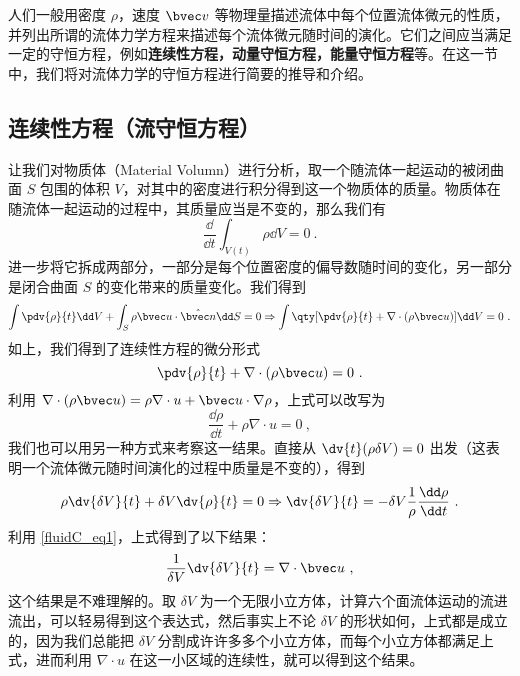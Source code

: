

人们一般用密度 $\rho$，速度 $\bvec v$ 等物理量描述流体中每个位置流体微元的性质，并列出所谓的流体力学方程来描述每个流体微元随时间的演化。它们之间应当满足一定的守恒方程，例如\textbf{连续性方程，动量守恒方程，能量守恒方程}等。在这一节中，我们将对流体力学的守恒方程进行简要的推导和介绍。
\subsection{连续性方程（流守恒方程）}
让我们对物质体（Material Volumn）进行分析，取一个随流体一起运动的被闭曲面 $S$ 包围的体积 $V$，对其中的密度进行积分得到这一个物质体的质量。物质体在随流体一起运动的过程中，其质量应当是不变的，那么我们有
\begin{equation}
\frac{\dd}{\dd t}\int_{V(t)} \rho \dd V=0~.
\end{equation}
进一步将它拆成两部分，一部分是每个位置密度的偏导数随时间的变化，另一部分是闭合曲面 $S$ 的变化带来的质量变化。我们得到
\begin{equation}
\int \pdv{\rho}{t}\dd V+\int_S \rho \bvec u\cdot \hat{\bvec n}\dd S=0\Rightarrow \int \qty[\pdv{\rho}{t}+\nabla\cdot(\rho\bvec u)]\dd V=0~.
\end{equation}
如上，我们得到了连续性方程的微分形式
\begin{equation}\label{fluidC_eq6}
\pdv{\rho}{t}+\nabla\cdot(\rho\bvec u)=0~.
\end{equation}
利用 $\nabla\cdot (\rho\bvec u)=\rho \nabla\cdot u+\bvec u\cdot \nabla \rho$，上式可以改写为
\begin{equation}\label{fluidC_eq1}
\frac{\dd \rho}{\dd t}+\rho \nabla\cdot u=0~,
\end{equation}
我们也可以用另一种方式来考察这一结果。直接从 $\dv{t} (\rho \delta V)=0$ 出发（这表明一个流体微元随时间演化的过程中质量是不变的），得到
\begin{equation}
\rho \dv{\delta V}{t}+\delta V\dv{\rho}{t}=0\Rightarrow \dv{\delta V}{t}=-\delta V \frac{1}{\rho}\frac{\dd \rho}{\dd t}~.
\end{equation}
利用 \autoref{fluidC_eq1}，上式得到了以下结果：
\begin{equation}
\frac{1}{\delta V}\dv{\delta V}{t}=\nabla\cdot \bvec u~,
\end{equation}
这个结果是不难理解的。取 $\delta V$ 为一个无限小立方体，计算六个面流体运动的流进流出，可以轻易得到这个表达式，然后事实上不论 $\delta V$ 的形状如何，上式都是成立的，因为我们总能把 $\delta V$ 分割成许许多多个小立方体，而每个小立方体都满足上式，进而利用 $\nabla\cdot u$ 在这一小区域的连续性，就可以得到这个结果。
